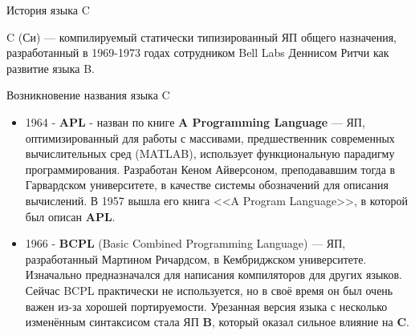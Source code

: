 \begin{frame}[t]{История языка C}

  C (Си) --- компилируемый статически типизированный ЯП общего назначения,
  разработанный в 1969-1973 годах сотрудником Bell Labs Деннисом Ритчи как развитие языка B.



\end{frame}

\begin{frame}[t]{Возникновение названия языка C}

  \begin{itemize}
  \item 1964 - \textbf{APL} - назван по книге \textbf{A Programming Language} --- ЯП, 
     оптимизированный для работы с массивами, предшественник современных вычислительных сред (MATLAB), 
   использует функциональную парадигму программирования.    
   Разработан Кеном Айверсоном, преподававшим тогда в Гарвардском университете, 
   в качестве системы обозначений для описания вычислений. 
   В 1957 вышла его книга <<A Program Language>>, в которой был описан \textbf{APL}. 
   
\item 1966 - \textbf{BCPL} (Basic Combined Programming Language) --- ЯП,
разработанный Мартином Ричардсом, в Кембриджском университете. 
Изначально предназначался для написания компиляторов для других языков.
  Сейчас BCPL практически не используется, но в своё время он был очень важен из-за хорошей портируемости. 
  Урезанная версия языка с несколько изменённым синтаксисом стала ЯП \textbf{B}, который оказал сильное влияние на \textbf{C}. 
  \end{itemize}
\end{frame}

